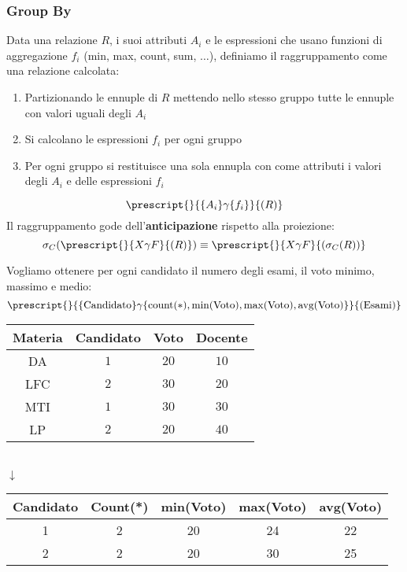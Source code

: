 \subsubsection{Group By}
Data una relazione $R$, i suoi attributi $A_i$ e le espressioni che usano funzioni di aggregazione $f_i$ (min, max, count, sum, $\ldots$), definiamo il raggruppamento come una relazione calcolata:
\begin{enumerate}
	\item  Partizionando le ennuple di $R$ mettendo nello stesso gruppo tutte le ennuple con valori uguali degli $A_i$
	\item Si calcolano le espressioni $f_i$ per ogni gruppo
	\item Per ogni gruppo si restituisce una sola ennupla con come attributi i valori degli $A_i$ e delle espressioni $f_i$
\end{enumerate}	
\begin{equation}
	\prescript{}{\{A_i\}\gamma\{f_i\}}{(R)}
\end{equation}
Il raggruppamento gode dell'\textbf{anticipazione} rispetto alla proiezione:
\begin{equation}
	\sigma_C(\prescript{}{X\gamma F}{(R)}) \equiv \prescript{}{X\gamma F}{(\sigma_C(R))}
\end{equation}
\begin{example}
	Vogliamo ottenere per ogni candidato il numero degli esami, il voto minimo, massimo e medio:
	\begin{equation*}
		\prescript{}{\{\text{Candidato}\} \gamma \{\text{count}(*), \min(\text{Voto}), \max(\text{Voto}), \text{avg}(\text{Voto})\}}{(\text{Esami})}
	\end{equation*}
	\begin{table}[!h]
		\centering
		\begin{tabular}{|c|c|c|c|}
			\hline
			\textbf{Materia} & \textbf{Candidato} & \textbf{Voto} & \textbf{Docente} \\
			\hline
			DA & $1$ & $20$ & $10$ \\
			\hline
			LFC & $2$ & $30$ & $20$ \\
			\hline
			MTI & $1$ & $30$ & $30$ \\
			\hline
			LP & $2$ & $20$ & $40$ \\
			\hline
		\end{tabular}\\
		\vspace{10pt} $\downarrow$ \vspace{10pt}\\	
		\begin{tabular}{|c|c|c|c|c|}
			\hline
			\textbf{Candidato} & \textbf{Count(*)} & \textbf{min(Voto)} & \textbf{max(Voto)} & \textbf{avg(Voto)} \\
			\hline
			1 & 2 & 20 & 24 & 22 \\
			\hline
			2 & 2 & 20 & 30 & 25 \\
			\hline
		\end{tabular}
	\end{table}
\end{example}
